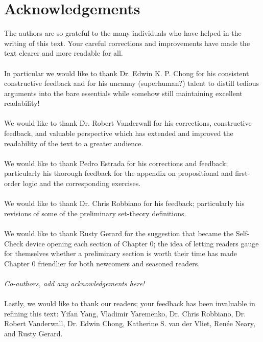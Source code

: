 \section{Acknowledgements}
The authors are so grateful to the many individuals who have helped in the writing of this text. Your careful corrections and improvements have made the text clearer and more readable for all.
 \\ \\
In particular we would like to thank Dr. Edwin K. P. Chong for his consistent constructive feedback and for his uncanny (superhuman?) talent to distill tedious arguments into the bare essentials while somehow still maintaining excellent readability! \\ \\
We would like to thank Dr. Robert Vanderwall for his corrections, constructive feedback, and valuable perspective which has extended and improved the readability of the text to a greater audience. 
\\ \\
We would like to thank Pedro Estrada for his corrections and feedback; particularly his thorough feedback for the appendix on propositional and first-order logic and the corresponding exercises. \\ \\
We would like to thank Dr. Chris Robbiano for his feedback; particularly his revisions of some of the preliminary set-theory definitions. \\ \\
We would like to thank Rusty Gerard for the suggestion that became the Self-Check device opening each section of Chapter 0; the idea of letting readers gauge for themselves whether a preliminary section is worth their time has made Chapter 0 friendlier for both newcomers and seasoned readers. \\ \\
\textit{Co-authors, add any acknowledgements here!} \\ \\

\noindent Lastly, we would like to thank our readers; your feedback has been invaluable in refining this text: Yifan Yang, Vladimir Yaremenko, Dr. Chris Robbiano, Dr. Robert Vanderwall, Dr. Edwin Chong, Katherine S. van der Vliet, Ren\'{e}e Neary, and Rusty Gerard.